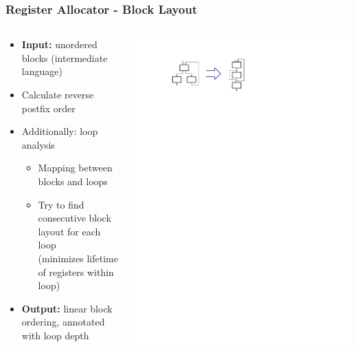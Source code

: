 \documentclass[navbaroff,en]{sdqbeamer}
\begin{document}
\begin{frame}
\frametitle{Register Allocator - Block Layout}

	\begin{columns}
		\begin{column}{0.65\textwidth}
			\begin{itemize}
				\item \textbf{Input:} unordered blocks (intermediate language)
				\item Calculate reverse postfix order
				\item Additionally: loop analysis
					\begin{itemize}
						\item Mapping between blocks and loops
						\item Try to find consecutive block layout for each loop\\ (minimizes lifetime of registers within loop)
					\end{itemize}
				\item \textbf{Output:} linear block ordering, annotated with loop depth
			\end{itemize}
		\end{column}
	
		 \begin{column}{0.35\textwidth}
		 	\centering \includegraphics[scale=0.7]{images/block_layout.pdf}
		 \end{column}
	\end{columns}
\end{frame}
\end{document}
